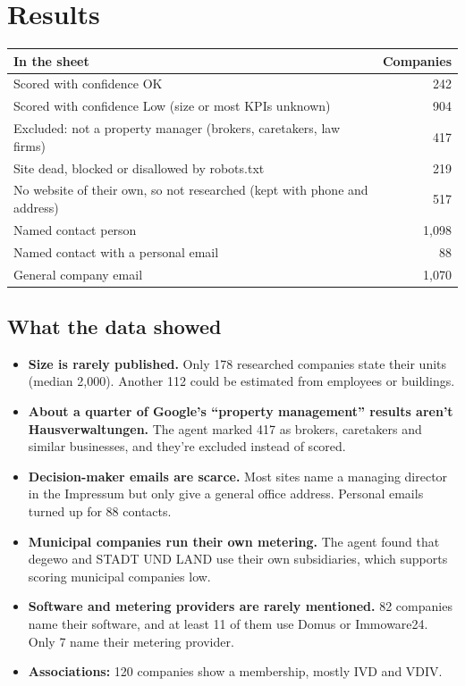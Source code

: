 \documentclass[11pt,a4paper]{article}
\begin{document}
\section{Results}

\begin{tabularx}{\linewidth}{@{}L r@{}}
\toprule
\textbf{In the sheet} & \textbf{Companies} \\
\midrule
Scored with confidence OK & 242 \\
Scored with confidence Low (size or most KPIs unknown) & 904 \\
Excluded: not a property manager (brokers, caretakers, law firms) & 417 \\
Site dead, blocked or disallowed by robots.txt & 219 \\
No website of their own, so not researched (kept with phone and address) & 517 \\
Named contact person & 1,098 \\
Named contact with a personal email & 88 \\
General company email & 1,070 \\
\bottomrule
\end{tabularx}

\subsection{What the data showed}
\begin{itemize}
  \item \textbf{Size is rarely published.} Only 178 researched companies state their units
        (median 2,000). Another 112 could be estimated from employees or buildings.
  \item \textbf{About a quarter of Google's ``property management'' results aren't
        Hausverwaltungen.} The agent marked 417 as brokers, caretakers and similar businesses,
        and they're excluded instead of scored.
  \item \textbf{Decision-maker emails are scarce.} Most sites name a managing director in the
        Impressum but only give a general office address. Personal emails turned up for 88
        contacts.
  \item \textbf{Municipal companies run their own metering.} The agent found that degewo and
        STADT UND LAND use their own subsidiaries, which supports scoring municipal companies low.
  \item \textbf{Software and metering providers are rarely mentioned.} 82 companies name their
        software, and at least 11 of them use Domus or Immoware24. Only 7 name their metering
        provider.
  \item \textbf{Associations:} 120 companies show a membership, mostly IVD and VDIV.
\end{itemize}
\end{document}
